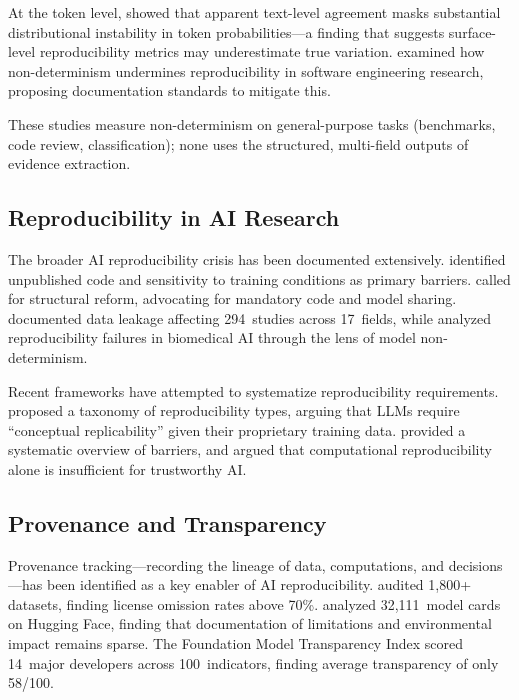 \documentclass[preprint,review,12pt,authoryear]{elsarticle}
\begin{document}
At the token level, \citet{fu2026beyond} showed that apparent text-level agreement masks substantial distributional instability in token probabilities---a finding that suggests surface-level reproducibility metrics may underestimate true variation.
\citet{angermeir2025icse} examined how non-determinism undermines reproducibility in software engineering research, proposing documentation standards to mitigate this.

These studies measure non-determinism on general-purpose tasks (benchmarks, code review, classification); none uses the structured, multi-field outputs of evidence extraction.

\subsection{Reproducibility in AI Research}

The broader AI reproducibility crisis has been documented extensively.
\citet{hutson2018science} identified unpublished code and sensitivity to training conditions as primary barriers.
\citet{haibe2020nature} called for structural reform, advocating for mandatory code and model sharing.
\citet{kapoor2023leakage} documented data leakage affecting 294~studies across 17~fields, while \citet{han2025biomedical} analyzed reproducibility failures in biomedical AI through the lens of model non-determinism.

Recent frameworks have attempted to systematize reproducibility requirements.
\citet{desai2025reproducibility} proposed a taxonomy of reproducibility types, arguing that LLMs require ``conceptual replicability'' given their proprietary training data.
\citet{semmelrock2025barriers} provided a systematic overview of barriers, and \citet{yu2024hdsr} argued that computational reproducibility alone is insufficient for trustworthy AI.

\subsection{Provenance and Transparency}

Provenance tracking---recording the lineage of data, computations, and decisions---has been identified as a key enabler of AI reproducibility.
\citet{longpre2024audit} audited 1,800+ datasets, finding license omission rates above 70\%.
\citet{liang2024modelcards} analyzed 32,111~model cards on Hugging Face, finding that documentation of limitations and environmental impact remains sparse.
The Foundation Model Transparency Index \citep{bommasani2024fmti} scored 14~major developers across 100~indicators, finding average transparency of only 58/100.
\end{document}
